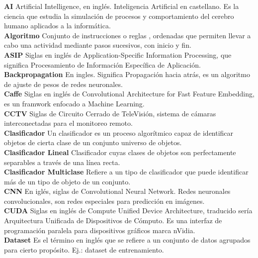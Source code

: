 \documentclass[a4paper,12pt,oneside,spanish]{book}
\begin{document}
\textbf{AI} Artificial Intelligence, en inglés. Inteligencia Artificial en castellano. Es la ciencia que estudia la simulación de procesos y comportamiento del cerebro humano aplicados a la informática.\\
 
\textbf{Algoritmo} Conjunto de instrucciones o reglas , ordenadas que permiten llevar a cabo una actividad mediante pasos sucesivos, con inicio y fin.\\
 
\textbf{ASIP} Siglas en inglés de Application-Specific Information Processing, que significa Procesamiento de Información Específica de Aplicación.\\
 
\textbf{Backpropagation} En ingles.  Significa Propagación hacia atrás, es un algoritmo de ajuste de pesos de redes neuronales.\\

\textbf{Caffe} Siglas en inglés de Convolutional Architecture for Fast Feature Embedding, es un framwork enfocado a Machine Learning.\\
 
\textbf{CCTV} Siglas de Circuito Cerrado de TeleVisión, sistema de cámaras interconectadas para el monitoreo remoto.\\
 
\textbf{Clasificador} Un clasificador es un proceso algorítmico capaz de identificar objetos de cierta clase de un conjunto universo de objetos.\\
 
\textbf{Clasificador Lineal} Clasificador cuyas clases de objetos son perfectamente separables a través de una línea recta.\\
 
\textbf{Clasificador Multiclase} Refiere a un tipo de clasificador que puede identificar más de un tipo de objeto de un conjunto.\\
 
\textbf{CNN} En iglés, siglas de Convolutional Neural Network. Redes neuronales convolucionales, son redes especiales para predicción en imágenes.\\
 
\textbf{CUDA} Siglas en inglés de Compute Unified Device Architecture, traducido sería Arquitectura Unificada de Dispositivos de Cómputo. Es una interfaz de programación paralela para dispositivos gráficos marca nVidia.\\
 
\textbf{Dataset} Es el término en inglés que se refiere a un conjunto de datos agrupados para cierto propósito. Ej.: dataset de entrenamiento.\\
 
\end{document}
